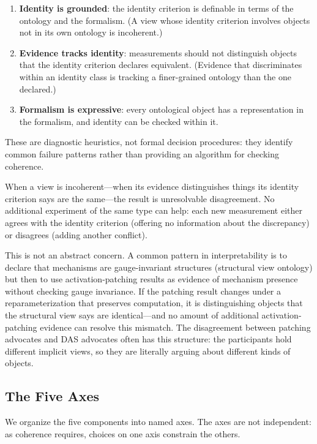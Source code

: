 \documentclass{article}
\begin{document}
\begin{enumerate}[leftmargin=*, label=(\roman*)]
\item \textbf{Identity is grounded}: the identity criterion is
      definable in terms of the ontology and the formalism.  (A view
      whose identity criterion involves objects not in its own ontology
      is incoherent.)
\item \textbf{Evidence tracks identity}: measurements should not
      distinguish objects that the identity criterion declares
      equivalent.  (Evidence that discriminates within an identity
      class is tracking a finer-grained ontology than the one
      declared.)
\item \textbf{Formalism is expressive}: every ontological object has
      a representation in the formalism, and identity can be checked
      within it.
\end{enumerate}

These are diagnostic heuristics, not formal decision procedures: they identify common failure patterns rather than providing an algorithm for checking coherence.

When a view is incoherent---when its evidence distinguishes things its
identity criterion says are the same---the result is unresolvable
disagreement.  No additional experiment of the same type can help:
each new measurement either agrees with the identity criterion (offering
no information about the discrepancy) or disagrees (adding another
conflict).

This is not an abstract concern.  A common pattern in interpretability
is to declare that mechanisms are gauge-invariant structures (structural
view ontology) but then to use activation-patching results as evidence
of mechanism presence without checking gauge invariance.  If the
patching result changes under a reparameterization that preserves
computation, it is distinguishing objects that the structural view says
are identical---and no amount of additional activation-patching evidence
can resolve this mismatch.  The disagreement between patching advocates
and DAS advocates often has this structure: the participants hold
different implicit views, so they are literally arguing about different
kinds of objects.

\subsection{The Five Axes}\label{sec:axes}

We organize the five components into named axes.  The axes are not
independent: as coherence requires, choices on one axis constrain the
others.
\end{document}
